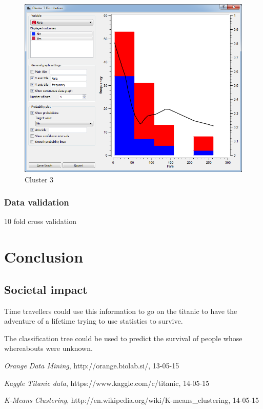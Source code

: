 \documentclass[a4paper,11pt]{article}
\begin{document}
\begin{figure}[h]
\begin{center}
		\includegraphics[scale=0.30]{ClusterDistribution/Cluster3/Fare}
	\end{center}
	\caption{Cluster 3}
	\label{ClusterThree}
\end{figure}


\subsubsection{Data validation}
10 fold cross validation
\clearpage
\section{Conclusion}
\subsection{Societal impact}
Time travellers could use this information to go on the titanic to have the adventure of a lifetime trying to use statistics to survive.

The classification tree could be used to predict the survival of people whose whereabouts were unknown.




\appendix
\begin{thebibliography}{9}

  \emph{Orange Data Mining},
  http://orange.biolab.si/,
  13-05-15
  
	\emph{Kaggle Titanic data},
	https://www.kaggle.com/c/titanic,
	14-05-15
	
	\emph{K-Means Clustering},
	http://en.wikipedia.org/wiki/K-means\_clustering,
	14-05-15
\end{thebibliography}
\end{document}

